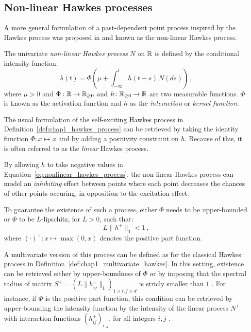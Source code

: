 \subsection{Non-linear Hawkes processes}

A more general formulation of a past-dependent point process inspired by the Hawkes process was proposed in \cite{Bremaud1996} and known as the non-linear Hawkes process.

\begin{definition}
    The univariate \emph{non-linear Hawkes process} $N$ on ${\mathbb R}$ is defined by the conditional intensity function:
    \begin{equation}\label{eq:nonlinear_hawkes_process}
        \lambda(t) = \Phi\left(\mu + \int_{-\infty}^{t}{h(t-s)\,N(ds)}\right)\,,
    \end{equation}
    where $\mu>0$ and $\Phi:{\mathbb R} \to {\mathbb R}_{\geq 0}$ and $h\colon {\mathbb R}_{\geq 0}\to {\mathbb R}$ are two measurable functions.
    $\Phi$ is known as the activation function and $h$ as the \emph{interaction} or \emph{kernel function}.
\end{definition}
The usual formulation of the self-exciting Hawkes process in Definition~\ref{def:chap1_hawkes_process} can be retrieved by taking the identity function $\Phi\colon x \mapsto x$ and by adding a positivity constraint on $h$. 
Because of this, it is often referred to as the \emph{linear} Hawkes process.

By allowing $h$ to take negative values in Equation~\eqref{eq:nonlinear_hawkes_process}, the non-linear Hawkes process can model an \emph{inhibiting} effect between points where each point decreases the chances of other points occuring, in opposition to the excitation effect.

To guarantee the existence of such a process, either $\Phi$ needs to be upper-bounded or $\Phi$ to be $L$-lipschitz, for $L>0$, such that:
\[L\|h^+\|_1 < 1\,,\]
where $(\cdot)^+\colon x \mapsto \max(0, x)$ denotes the positive part function.

A multivariate version of this process can be defined as for the classical Hawkes process in Definition~\ref{def:chap1_multivariate_hawkes}.
In this setting, existence can be retrieved either by upper-boundness of $\Phi$ or by imposing that the spectral radius of matrix $S^+ = (L \|h_{ij}^+\|_1)_{1 \geq i,j \geq d}$ is stricly smaller than $1$ \parencite[Lemma 2.1]{Sulem2024}.
For instance, if $\Phi$ is the positive part function, this condition can be retrieved by upper-bounding the intensity function by the intensity of the linear process $N^+$ with interaction functions $(h_{ij}^+)_{i,j}$, for all integers $i,j$ \parencite[Theorem 2]{Deutsch2022}.

